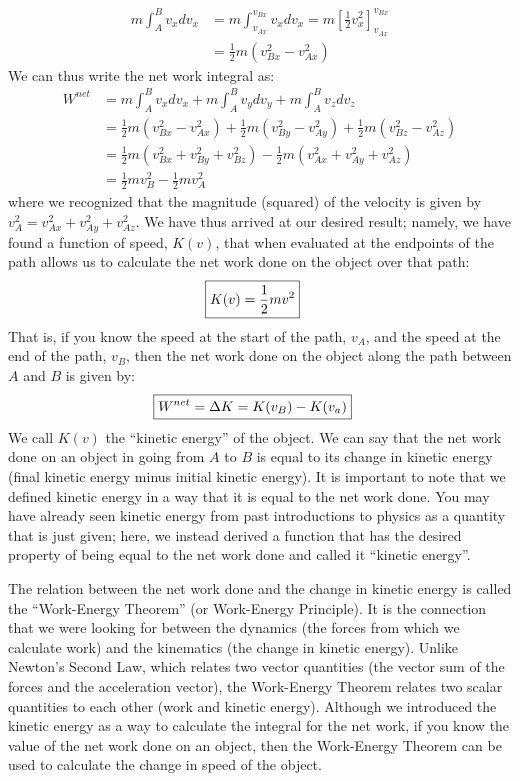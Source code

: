 \begin{align*}
m\int_A^B v_xdv_x &= m\int_{v_{Ax}}^{v_{Bx}} v_xdv_x= m\left[\frac{1}{2}v_x^2  \right]_{v_{Ax}}^{v_{Bx}}\\
&=\frac{1}{2}m(v_{Bx}^2-v_{Ax}^2)
\end{align*} 
We can thus write the net work integral as:
\begin{align*}
W^{net} &=m\int_A^B v_xdv_x +m\int_A^B  v_ydv_y + m\int_A^B v_zdv_z\\
&=\frac{1}{2}m(v_{Bx}^2-v_{Ax}^2) + \frac{1}{2}m(v_{By}^2-v_{Ay}^2) +\frac{1}{2}m(v_{Bz}^2-v_{Az}^2)\\
&=\frac{1}{2}m(v_{Bx}^2+v_{By}^2+v_{Bz}^2)-\frac{1}{2}m(v_{Ax}^2+v_{Ay}^2+v_{Az}^2)\\
&=\frac{1}{2}mv_B^2 - \frac{1}{2}mv_A^2
\end{align*}
where we recognized that the magnitude (squared) of the velocity is given by $v_A^2 = v_{Ax}^2+v_{Ay}^2+v_{Az}^2$. We have thus arrived at our desired result; namely, we have found a function of speed, $K(v)$, that when evaluated at the endpoints of the path allows us to calculate the net work done on the object over that path:
\begin{align}
\Aboxed{K(v) = \frac{1}{2}mv^2}
\end{align}
That is, if you know the speed at the start of the path, $v_A$, and the speed at the end of the path, $v_B$, then the net work done on the object along the path between $A$ and $B$ is given by:
\begin{align}
\Aboxed{W^{net} = \Delta K = K(v_B) - K(v_a)}
\end{align}
We call $K(v)$ the ``kinetic energy'' of the object. We can say that the net work done on an object in going from $A$ to $B$ is equal to its change in kinetic energy (final kinetic energy minus initial kinetic energy). It is important to note that we defined kinetic energy in a way that it is equal to the net work done. You may have already seen kinetic energy from past introductions to physics as a quantity that is just given; here, we instead derived a function that has the desired property of being equal to the net work done and called it ``kinetic energy''. 

The relation between the net work done and the change in kinetic energy is called the ``Work-Energy Theorem'' (or Work-Energy Principle). It is the connection that we were looking for between the dynamics (the forces from which we calculate work) and the kinematics (the change in kinetic energy). Unlike Newton's Second Law, which relates two vector quantities (the vector sum of the forces and the acceleration vector), the Work-Energy Theorem relates two scalar quantities to each other (work and kinetic energy). Although we introduced the kinetic energy as a way to calculate the integral for the net work, if you know the value of the net work done on an object, then the Work-Energy Theorem can be used to calculate the change in speed of the object.

